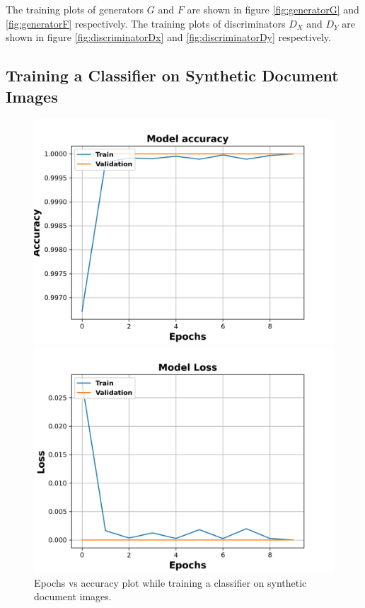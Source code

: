 The training plots of generators $G$ and $F$ are shown in figure \ref{fig:generatorG} and \ref{fig:generatorF} respectively. The training plots of discriminators $D_X$ and $D_Y$ are shown in figure \ref{fig:discriminatorDx} and \ref{fig:discriminatorDy} respectively. 


\subsection{Training a Classifier on Synthetic Document Images}\label{trainingsyntheticclassifier}





\begin{figure}[H]
  \centering
  \begin{minipage}[b]{0.49\textwidth}
    \includegraphics[width=\textwidth]{images/Evaluation/Synthetic_Data_Classifier_2021-05-31_16-40-33_Accuracy.png}
    \caption[Epochs vs accuracy plot while training a classifier on synthetic document images.]{Epochs vs accuracy plot while training a classifier on synthetic document images.}
    \label{fig:SyntheticClassifierAcc}
  \end{minipage}
  \hfill
  \begin{minipage}[b]{0.49\textwidth}
    \includegraphics[width=\textwidth]{images/Evaluation/Synthetic_Data_Classifier_2021-05-31_16-40-33_Loss.png}

\end{minipage}
\end{figure}
